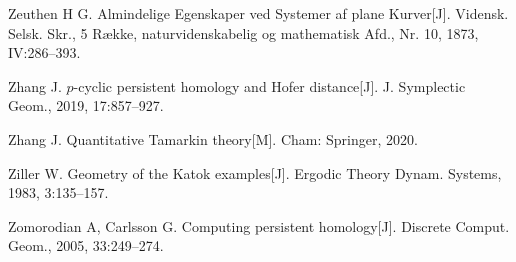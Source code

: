 \begin{enumerate}[label={[\arabic*]},leftmargin=3.2em,itemsep=2pt,parsep=0pt]
  \item Zeuthen H G. Almindelige Egenskaper ved Systemer af plane Kurver[J]. Vidensk. Selsk.
        Skr., 5 Række, naturvidenskabelig og mathematisk Afd., Nr. 10, 1873, IV:286--393.
  \item Zhang J. $p$-cyclic persistent homology and Hofer distance[J]. J. Symplectic Geom.,
        2019, 17:857--927.
  \item Zhang J. Quantitative Tamarkin theory[M]. Cham: Springer, 2020.
  \item Ziller W. Geometry of the Katok examples[J]. Ergodic Theory Dynam. Systems, 1983,
        3:135--157.
  \item Zomorodian A, Carlsson G. Computing persistent homology[J]. Discrete Comput. Geom.,
        2005, 33:249--274.
\end{enumerate}
\endgroup

